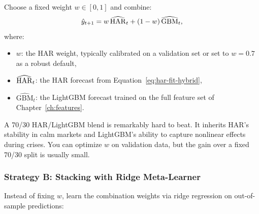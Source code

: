 Choose a fixed weight $w \in [0,1]$ and combine:
\begin{equation}\label{eq:weighted-avg}
  \hat{y}_{t+1} = w\,\widehat{\operatorname{HAR}}_t + (1-w)\,\widehat{\text{GBM}}_t,
\end{equation}
where:
\begin{itemize}
  \item $w$: the HAR weight, typically calibrated on a validation set
        or set to $w = 0.7$ as a robust default,
  \item $\widehat{\operatorname{HAR}}_t$: the HAR forecast from
        Equation~\eqref{eq:har-fit-hybrid},
  \item $\widehat{\text{GBM}}_t$: the LightGBM forecast trained on the
        full feature set of Chapter~\ref{ch:features}.
\end{itemize}

\begin{keyidea}
A 70/30 HAR/LightGBM blend is remarkably hard to beat.  It inherits HAR's
stability in calm markets and LightGBM's ability to capture nonlinear
effects during crises.  You can optimize $w$ on validation data, but the
gain over a fixed 70/30 split is usually small.
\end{keyidea}

\subsubsection{Strategy B: Stacking with Ridge Meta-Learner}

Instead of fixing $w$, learn the combination weights via ridge regression
on out-of-sample predictions:

